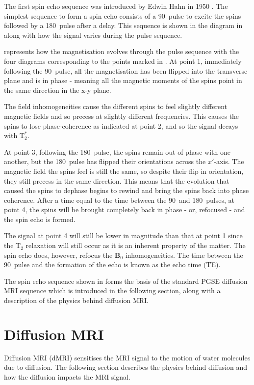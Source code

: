 The first spin echo sequence was introduced by Edwin Hahn in 1950 \cite{Hahn1950}. The simplest sequence to form a spin echo consists of a 90\degree\ pulse to excite the spins followed by a 180\degree\ pulse after a delay. 
This sequence is shown in the diagram in  along with how the signal varies during the pulse sequence.
 
 represents how the magnetisation evolves through the pulse sequence with the four diagrams corresponding to the points marked in . 
At point 1, immediately following the 90\degree\ pulse, all the magnetisation has been flipped into the transverse plane and is in phase - meaning all the magnetic moments of the spins point in the same direction in the x-y plane. 

The field inhomogeneities cause the different spins to feel slightly different magnetic fields and so precess at slightly different frequencies. 
This causes the spins to lose phase-coherence as indicated at point 2, and so the signal decays with $\mathrm{T}_2^*$.  

At point 3, following the 180\degree\ pulse, the spins remain out of phase with one another, but the 180\degree\ pulse has flipped their orientations across the $x'$-axis. 
The magnetic field the spins feel is still the same, so despite their flip in orientation, they still precess in the same direction. 
This means that the evolution that caused the spins to dephase begins to rewind and bring the spins back into phase coherence. 
After a time equal to the time between the 90\degree\ and 180\degree\ pulses, at point 4, the spins will be brought completely back in phase - or, refocused - and the spin echo is formed. 

The signal at point 4 will still be lower in magnitude than that at point 1 since the $\mathrm{T}_2$ relaxation will still occur as it is an inherent property of the matter. 
The spin echo does, however, refocus the $\mathbf{B}_0$ inhomogeneities. 
The time between the 90\degree\ pulse and the formation of the echo is known as the echo time (TE). 

The spin echo sequence shown in  forms the basis of the standard \ac{PGSE} diffusion MRI sequence which is introduced in the following section, along with a description of the physics behind diffusion MRI. 

\section{Diffusion MRI}
\label{sec:diffusion_physics}
Diffusion MRI (dMRI) sensitises the \ac{MRI} signal to the motion of water molecules due to diffusion. The following section describes the physics behind diffusion and how the diffusion impacts the \ac{MRI} signal.

